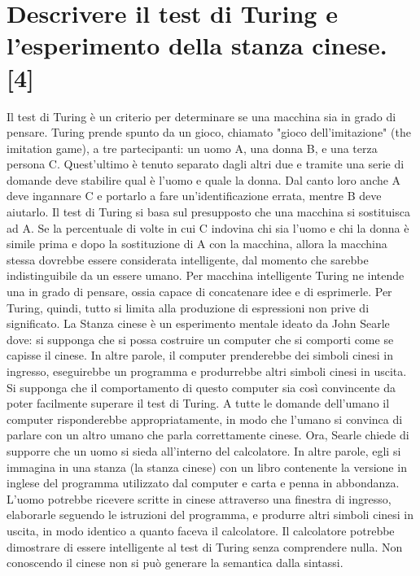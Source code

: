 \documentclass[\main/main.tex]{subfiles}
\begin{document}
\section{Descrivere il test di Turing e l'esperimento della stanza cinese. [4]}
Il test di Turing è un criterio per determinare se una macchina sia in grado di pensare. Turing prende spunto da un gioco, chiamato "gioco dell'imitazione" (the imitation game), a tre partecipanti: un uomo A, una donna B, e una terza persona C. Quest'ultimo è tenuto separato dagli altri due e tramite una serie di domande deve stabilire qual è l'uomo e quale la donna. Dal canto loro anche A deve ingannare C e portarlo a fare un'identificazione errata, mentre B deve aiutarlo.
Il test di Turing si basa sul presupposto che una macchina si sostituisca ad A. Se la percentuale di volte in cui C indovina chi sia l'uomo e chi la donna è simile prima e dopo la sostituzione di A con la macchina, allora la macchina stessa dovrebbe essere considerata intelligente, dal momento che sarebbe indistinguibile da un essere umano.
Per macchina intelligente Turing ne intende una in grado di pensare, ossia capace di concatenare idee e di esprimerle. Per Turing, quindi, tutto si limita alla produzione di espressioni non prive di significato.
La Stanza cinese è un esperimento mentale ideato da John Searle dove: si supponga che si possa costruire un computer che si comporti come se capisse il cinese. In altre parole, il computer prenderebbe dei simboli cinesi in ingresso, eseguirebbe un programma e produrrebbe altri simboli cinesi in uscita. Si supponga che il comportamento di questo computer sia così convincente da poter facilmente superare il test di Turing. A tutte le domande dell'umano il computer risponderebbe appropriatamente, in modo che l'umano si convinca di parlare con un altro umano che parla correttamente cinese.
Ora, Searle chiede di supporre che un uomo si sieda all'interno del calcolatore. In altre parole, egli si immagina in una stanza (la stanza cinese) con un libro contenente la versione in inglese del programma utilizzato dal computer e carta e penna in abbondanza. L'uomo potrebbe ricevere scritte in cinese attraverso una finestra di ingresso, elaborarle seguendo le istruzioni del programma, e produrre altri simboli cinesi in uscita, in modo identico a quanto faceva il calcolatore.
Il calcolatore potrebbe dimostrare di essere intelligente al test di Turing senza comprendere nulla. Non conoscendo il cinese non si può generare la semantica dalla sintassi.
\end{document}
